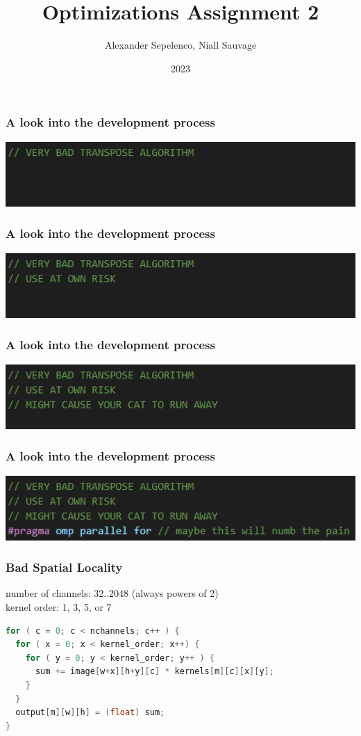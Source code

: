 \documentclass{beamer}
\title{Optimizations Assignment 2}
\author{Alexander Sepelenco, Niall Sauvage}
\date{2023}
\begin{document}
\frame{\titlepage}

\begin{frame}[fragile]
\frametitle{A look into the development process}
\includegraphics[width=1\textwidth]{images/opening_slide_joke1}
\end{frame}

\begin{frame}[fragile]
\frametitle{A look into the development process}
\includegraphics[width=1\textwidth]{images/opening_slide_joke2}
\end{frame}

\begin{frame}[fragile]
\frametitle{A look into the development process}
\includegraphics[width=1\textwidth]{images/opening_slide_joke3}
\end{frame}

\begin{frame}[fragile]
\frametitle{A look into the development process}
\includegraphics[width=1\textwidth]{images/opening_slide_joke4}
\end{frame}

\begin{frame}[fragile]
\frametitle{Bad Spatial Locality}
number of channels: 32..2048 (always powers of 2) \\
kernel order: 1, 3, 5, or 7
\begin{lstlisting}[language=C,keywordstyle=\color{blue}]
for ( c = 0; c < nchannels; c++ ) {
  for ( x = 0; x < kernel_order; x++) {
    for ( y = 0; y < kernel_order; y++ ) {
      sum += image[w+x][h+y][c] * kernels[m][c][x][y];
    }
  }
  output[m][w][h] = (float) sum;
}
\end{lstlisting}
\end{frame}
\end{document}
